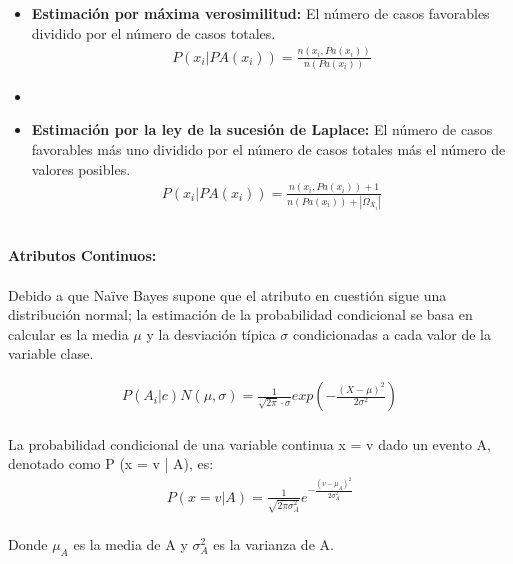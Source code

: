 \documentclass[letterpaper, 10 pt, conference]{ieeeconf}
\begin{document}
\begin{itemize}[leftmargin=*]
    \item[] \textbf{Estimación por máxima verosimilitud:} El número de casos favorables dividido por el número de casos totales.\\
    
    \begin{equation} \label{eq4}
    \begin{split}
    P(x_i|PA(x_i)) = \frac{n(x_i,Pa(x_i))}{n(Pa(x_i))}
    \end{split}
    \end{equation}
    \item[]
    \item[] \textbf{Estimación por la ley de la sucesión de Laplace:} El número de casos favorables más uno dividido por el número de casos totales más el número de valores posibles.\\
    \begin{equation} \label{eq5}
    \begin{split}
    P(x_i|PA(x_i)) = \frac{n(x_i,Pa(x_i))+1}{n(Pa(x_i))+| \Omega_{X_i} |}
    \end{split}
    \end{equation}
\end{itemize}

\textbf{\\Atributos Continuos:\\\\} Debido a que Naïve Bayes supone que el atributo en cuestión sigue una distribución normal; la estimación de la probabilidad condicional se basa en calcular es la media $\mu$ y la desviación típica $\sigma$ condicionadas a cada valor de la variable clase.

\begin{equation} \label{eq6}
\begin{split}
P(A_i|c) N(\mu,\sigma)= \frac{1}{\sqrt {2\pi} \cdot \sigma} exp(-\frac{(X-\mu)^2}{2\sigma^2})
\end{split}
\end{equation}\\ La probabilidad condicional de una variable continua x = v dado un evento A, denotado como P (x = v | A), es:\\

\begin{equation} \label{eq7}
\begin{split}
P(x=v|A) = \frac{1}{\sqrt{2 \pi \sigma^{2}_{A}}}e^{-\frac{(v-\mu_A)^2}{2\sigma_A^2}}
\end{split}
\end{equation} \\ Donde $\mu_A$ es la media de A y $\sigma_A^2$ es la varianza de A.\\
\end{document}
